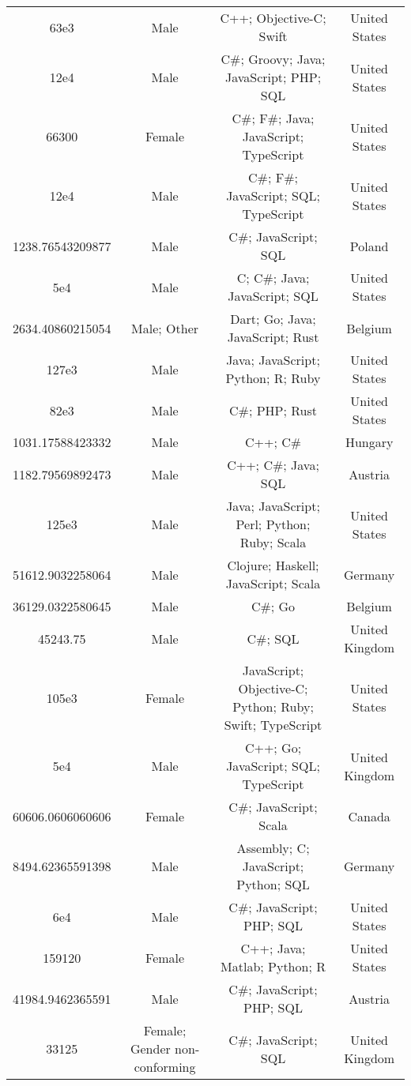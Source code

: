 \begin{center}
\begin{tabular}{ |c|c|c|c| }
63e3  &  Male  &  C++; Objective-C; Swift  &  United States  \\ 
12e4  &  Male  &  C\#; Groovy; Java; JavaScript; PHP; SQL  &  United States  \\ 
66300  &  Female  &  C\#; F\#; Java; JavaScript; TypeScript  &  United States  \\ 
12e4  &  Male  &  C\#; F\#; JavaScript; SQL; TypeScript  &  United States  \\ 
1238.76543209877  &  Male  &  C\#; JavaScript; SQL  &  Poland  \\ 
5e4  &  Male  &  C; C\#; Java; JavaScript; SQL  &  United States  \\ 
2634.40860215054  &  Male; Other  &  Dart; Go; Java; JavaScript; Rust  &  Belgium  \\ 
127e3  &  Male  &  Java; JavaScript; Python; R; Ruby  &  United States  \\ 
82e3  &  Male  &  C\#; PHP; Rust  &  United States  \\ 
1031.17588423332  &  Male  &  C++; C\#  &  Hungary  \\ 
1182.79569892473  &  Male  &  C++; C\#; Java; SQL  &  Austria  \\ 
125e3  &  Male  &  Java; JavaScript; Perl; Python; Ruby; Scala  &  United States  \\ 
51612.9032258064  &  Male  &  Clojure; Haskell; JavaScript; Scala  &  Germany  \\ 
36129.0322580645  &  Male  &  C\#; Go  &  Belgium  \\ 
45243.75  &  Male  &  C\#; SQL  &  United Kingdom  \\ 
105e3  &  Female  &  JavaScript; Objective-C; Python; Ruby; Swift; TypeScript  &  United States  \\ 
5e4  &  Male  &  C++; Go; JavaScript; SQL; TypeScript  &  United Kingdom  \\ 
60606.0606060606  &  Female  &  C\#; JavaScript; Scala  &  Canada  \\ 
8494.62365591398  &  Male  &  Assembly; C; JavaScript; Python; SQL  &  Germany  \\ 
6e4  &  Male  &  C\#; JavaScript; PHP; SQL  &  United States  \\ 
159120  &  Female  &  C++; Java; Matlab; Python; R  &  United States  \\ 
41984.9462365591  &  Male  &  C\#; JavaScript; PHP; SQL  &  Austria  \\ 
33125  &  Female; Gender non-conforming  &  C\#; JavaScript; SQL  &  United Kingdom  \\ 

\end{tabular}
\end{center}
